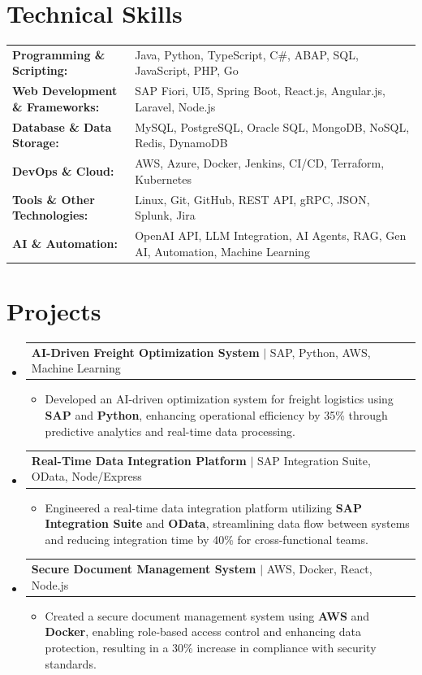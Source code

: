 \documentclass[letterpaper,10pt]{article}
\makeatletter
\newcommand{\resumeItem}[1]{
  \item{\fontsize{8pt}{9pt}\selectfont
    #1 \vspace{-3pt}
  }
}
\newcommand{\resumeProjectHeading}[2]{
    \item
    \begin{tabular*}{1.001\textwidth}{l@{\extracolsep{\fill}}r}
      \fontsize{8.5pt}{10pt}#1 & \textbf{\fontsize{8.5pt}{10pt} #2}\\
    \end{tabular*}\vspace{-7pt}
}
\newcommand{\resumeSubHeadingListStart}{\begin{itemize}[leftmargin=0pt, label={}]}
\newcommand{\resumeSubHeadingListEnd}{\end{itemize}}
\newcommand{\resumeItemListStart}{\begin{itemize}[leftmargin=*]}
\newcommand{\resumeItemListEnd}{\end{itemize}\vspace{-5pt}}
\makeatother
\begin{document}
\section{Technical Skills}
        \vspace{-14pt}
        \begin{table}[h]
            \fontsize{8pt}{9pt}\selectfont
            \begin{tabular}{p{0.3\linewidth} p{0.7\linewidth}}
                \textbf{Programming \& Scripting:} & Java, Python, TypeScript, C\#, ABAP, SQL, JavaScript, PHP, Go \\
                \textbf{Web Development \& Frameworks:} & SAP Fiori, UI5, Spring Boot, React.js, Angular.js, Laravel, Node.js \\
                \textbf{Database \& Data Storage:} & MySQL, PostgreSQL, Oracle SQL, MongoDB, NoSQL, Redis, DynamoDB \\
                \textbf{DevOps \& Cloud:} & AWS, Azure, Docker, Jenkins, CI/CD, Terraform, Kubernetes \\
                \textbf{Tools \& Other Technologies:} & Linux, Git, GitHub, REST API, gRPC, JSON, Splunk, Jira \\
                \textbf{AI \& Automation:} & OpenAI API, LLM Integration, AI Agents, RAG, Gen AI, Automation, Machine Learning \\
            \end{tabular}
        \end{table}
 \vspace{-18pt}

\section{Projects}
    \vspace{-5pt}
    \resumeSubHeadingListStart
          \resumeProjectHeading
            {\textbf{AI-Driven Freight Optimization System} $|$ SAP, Python, AWS, Machine Learning}{}
            \resumeItemListStart
                \resumeItem{Developed an AI-driven optimization system for freight logistics using \textbf{SAP} and \textbf{Python}, enhancing operational efficiency by 35\% through predictive analytics and real-time data processing.}
            \resumeItemListEnd
        \vspace{-12pt}
    
        \resumeProjectHeading
            {\textbf{Real-Time Data Integration Platform} $|$ SAP Integration Suite, OData, Node/Express}{}
        \resumeItemListStart
                \resumeItem{Engineered a real-time data integration platform utilizing \textbf{SAP Integration Suite} and \textbf{OData}, streamlining data flow between systems and reducing integration time by 40\% for cross-functional teams.}
        \resumeItemListEnd
      \vspace{-12pt}
      \resumeProjectHeading
        {\textbf{Secure Document Management System} $|$ AWS, Docker, React, Node.js}{}
    \resumeItemListStart
            \resumeItem{Created a secure document management system using \textbf{AWS} and \textbf{Docker}, enabling role-based access control and enhancing data protection, resulting in a 30\% increase in compliance with security standards.}
    \resumeItemListEnd
    \resumeSubHeadingListEnd
\end{document}
